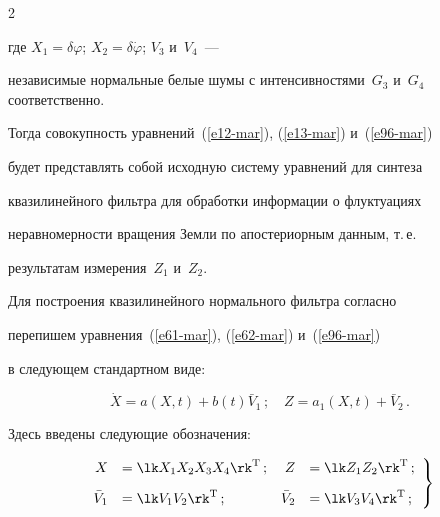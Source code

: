 \begin{multicols}{2}
\begin{equation}
    \end{equation}


где  $X_1 =\delta\varphi$; $ X_2 =\delta \dot\varphi$; $V_3$ и~$V_4$~---


независимые нормальные белые шумы с интенсивностями~$G_3$ и~$G_4$ соответственно. 


Тогда совокупность уравнений~(\ref{e12-mar}), (\ref{e13-mar}) и~(\ref{e96-mar}) 


будет представлять собой исходную сис\-тему уравнений для синтеза


квазилинейного фильтра для обработки информации о флуктуациях


неравномерности вращения Земли по апостериорным данным, т.\,е.\


результатам измерения~$Z_1$ и~$Z_2$.





Для построения квазилинейного нормального фильтра согласно~\cite{17-mar, 19-mar, 20-mar}


перепишем уравнения~(\ref{e61-mar}), (\ref{e62-mar}) и~(\ref{e96-mar}) 


в следующем стандартном виде:


\begin{equation}


\dot X = a (X,t) + b(t) \bar V_1\,;\quad Z= a_1 (X, t) +\bar V_2\,.


\label{e97-mar}


\end{equation}


Здесь введены следующие обозначения:


\begin{equation}


\left.


\begin{array}{rlrl}


 X&=\lk X_1 X_2 X_3 X_4\rk^{\mathrm{T}}\,; & Z&= \lk Z_1 Z_2\rk^{\mathrm{T}}\,;\\[9pt]


\bar V_1 &= \lk V_1 V_2\rk^{\mathrm{T}}\,; & \bar V_2 &=\lk V_3 V_4\rk^{\mathrm{T}}\,;


\end{array}


\right\}


\label{e98-mar}


\end{equation}






\end{multicols}
